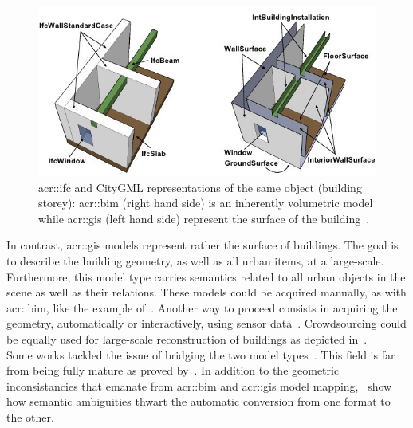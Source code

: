             \begin{figure}[htpb]
                \centering
                \includegraphics[width=\textwidth]{images/introduction/bim_vs_gis}            
                \caption{
                    \label{fig::bim_vs_gis} \gls{acr::ifc} and CityGML representations of the same object (building storey): \gls{acr::bim} (right hand side) is an inherently volumetric model while \gls{acr::gis} (left hand side) represent the surface of the building~\parencite{nagel2009conceptual}.
                }
            \end{figure}

            In contrast, \gls{acr::gis} models represent rather the surface of buildings.
            The goal is to describe the building geometry, as well as all urban items, at a large-scale.
            Furthermore, this model type carries semantics related to all urban objects in the scene as well as their relations.
            These models could be acquired manually, as with \gls{acr::bim}, like the example of~\textcite{ref3dnat}.
            Another way to proceed consists in acquiring the geometry, automatically or interactively, using sensor data~\parencite{musialski2013survey}.
            Crowdsourcing could be equally used for large-scale reconstruction of buildings as depicted in~\textcite{uden2013open}.\\

            Some works tackled the issue of bridging the two model types~\parencite{deng2016mapping}.
            This field is far from being fully mature as proved by~\textcite{stoter2018geo}.
            In addition to the geometric inconsistancies that emanate from \gls{acr::bim} and \gls{acr::gis} model mapping,~\textcite{stoter2018geo} show how semantic ambiguities thwart the automatic conversion from one format to the other.\\


